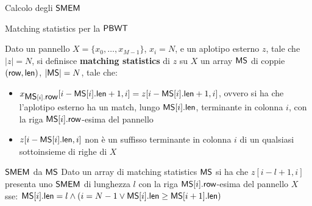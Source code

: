 \documentclass[]{beamer}
\def\len{\mbox{\rm {\sf len}}}
\def\row{\mbox{\rm {\sf row}}}
\def\MS{\mbox{\rm {\sf MS}}}
\def\PBWT{\mbox{\rm {\sf PBWT}}}
\def\SMEM{\mbox{\rm {\sf SMEM}}}
\begin{document}
\begin{frame}{Calcolo degli $\SMEM$}
  \begin{block}{Matching statistics per la $\PBWT$}
    {\small{
        Dato un pannello $X=\{x_0,\ldots,x_{M-1}\}$, $x_i=N$,
        e un aplotipo esterno $z$, tale che $|z|=N$, si definisce
        \textbf{matching
        statistics} di $z$ su $X$ un array $\MS$ di coppie $(\row,\len)$, 
        $|\MS|=N$, tale che:   
        \begin{itemize}
          \item $x_{\MS[i].\row}[i-\MS[i].\len+1,i]=z[i-\MS[i].\len+1,i]$, ovvero si
          ha che 
          l'aplotipo esterno ha un match, lungo $\MS[i].\len$, terminante in colonna
          $i$, con la riga 
          $\MS[i].\row$-esima del pannello
          \item $z[i-\MS[i].\len,i]$ non è un suffisso terminante in colonna $i$
          di un qualsiasi sottoinsieme di righe di $X$
        \end{itemize}
      }}
  \end{block}
  \pause
  \begin{block}{$\SMEM$ da $\MS$}
    {\small{
        Dato un array di matching statistics $\MS$ si ha che $z[i-l+1,i]$
        presenta uno $\SMEM$ di lunghezza $l$ con la riga $\MS[i].\row$-esima
        del 
        pannello $X$ sse: 
        $\MS[i].\len=l\land(i=N-1\lor \MS[i].\len\geq \MS[i+1].\len)$
      }}
  \end{block}
\end{frame}
\end{document}
